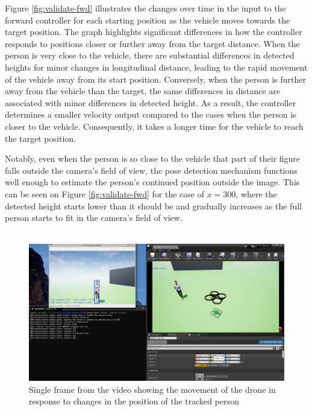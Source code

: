 Figure \ref{fig:validate-fwd} illustrates the changes over time in the input to the forward controller for each starting position as the vehicle moves towards the target position. The graph highlights significant differences in how the controller responds to positions closer or further away from the target distance. When the person is very close to the vehicle, there are substantial differences in detected heights for minor changes in longitudinal distance, leading to the rapid movement of the vehicle away from its start position. Conversely, when the person is further away from the vehicle than the target, the same differences in distance are associated with minor differences in detected height. As a result, the controller determines a smaller velocity output compared to the cases when the person is closer to the vehicle. Consequently, it takes a longer time for the vehicle to reach the target position.

Notably, even when the person is so close to the vehicle that part of their figure falls outside the camera's field of view, the pose detection mechanism functions well enough to estimate the person's continued position outside the image. This can be seen on Figure \ref{fig:validate-fwd} for the case of $x=300$, where the detected height starts lower than it should be and gradually increases as the full person starts to fit in the camera's field of view.
\\ \\


\begin{figure}[H]
  \centering
  \includegraphics[width=\textwidth, keepaspectratio]{img/video-follow-sitl.png}
  \caption{Single frame from the video showing the movement of the drone in response to changes in the position of the tracked person}
  \label{fig:airsim-test-follow}
\end{figure}

